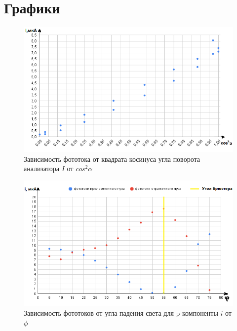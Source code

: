 \documentclass{article}
\begin{document}
\section{Графики}
\begin{figure}[h!]
    \begin{center}
    \includegraphics[scale=0.7]{chart1.png}
    \caption{Зависимость фототока от квадрата косинуса угла поворота анализатора $I$ от $cos^2\alpha$}
    \label{fig:graphUfromI}    
    \end{center}
\end{figure}
\begin{figure}[h!]
    \begin{center}
    \includegraphics[scale=0.7]{chart2.png}
    \caption{Зависимость фототоков от угла падения света для p-компоненты $i$ от $\phi$}
    \label{fig:graphUfromI}    
    \end{center}
\end{figure}
\end{document}
